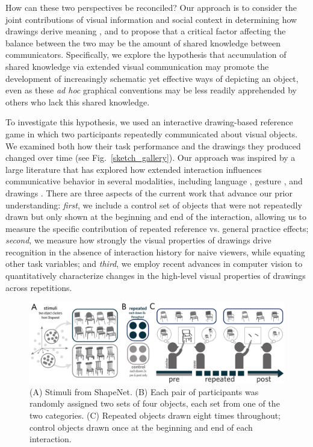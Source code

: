 \documentclass[10pt,letterpaper]{article}
\begin{document}
How can these two perspectives be reconciled?
Our approach is to consider the joint contributions of visual information and social context in determining how drawings derive meaning \cite{abell2009canny}, and to propose that a critical factor affecting the balance between the two may be the amount of shared knowledge between communicators.
Specifically, we explore the hypothesis that accumulation of shared knowledge via extended visual communication may promote the development of increasingly schematic yet effective ways of depicting an object, even as these \textit{ad hoc} graphical conventions may be less readily apprehended by others who lack this shared knowledge.

To investigate this hypothesis, we used an interactive drawing-based reference game in which two participants repeatedly communicated about visual objects.
We examined both how their task performance and the drawings they produced changed over time (see Fig.~\ref{sketch_gallery}).
Our approach was inspired by a large literature that has explored how extended interaction influences communicative behavior in several modalities, including language \cite{ClarkWilkesGibbs86_ReferringCollaborative,HawkinsFrankGoodman17_ConventionFormation}, gesture \cite{goldin1996silence}, and drawings \cite{garrod_foundations_2007,galantucci2005experimental}.
There are three aspects of the current work that advance our prior understanding: \emph{first}, we include a control set of objects that were not repeatedly drawn but only shown at the beginning and end of the interaction, allowing us to measure the specific contribution of repeated reference vs. general practice effects; \emph{second}, we measure how strongly the visual properties of drawings drive recognition in the absence of interaction history for naive viewers, while equating other task variables; and \emph{third}, we employ recent advances in computer vision to quantitatively characterize changes in the high-level visual properties of drawings across repetitions.




\begin{figure}
\begin{center}
\includegraphics[width=0.86\linewidth]{figures/task_stimuli.pdf}
\caption{(A) Stimuli from ShapeNet. (B) Each pair of participants was randomly assigned two sets of four objects, each set from one of the two categories. (C) Repeated objects drawn eight times throughout; control objects drawn once at the beginning and end of each interaction.}
\label{task_stimuli}
\vspace{-1em}
\end{center}
\end{figure}
\end{document}
